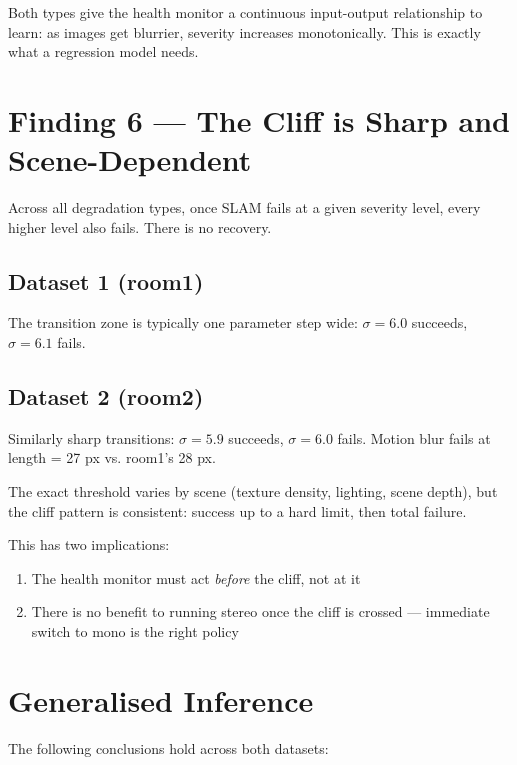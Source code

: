 \documentclass[11pt, a4paper]{article}
\begin{document}
Both types give the health monitor a continuous input-output relationship to
learn: as images get blurrier, severity increases monotonically. This is exactly
what a regression model needs.

\section{Finding 6 — The Cliff is Sharp and Scene-Dependent}

Across all degradation types, once SLAM fails at a given severity level, every
higher level also fails. There is no recovery.

\subsection{Dataset 1 (room1)}
The transition zone is typically one parameter step wide:
$\sigma = 6.0$ succeeds, $\sigma = 6.1$ fails.

\subsection{Dataset 2 (room2)}
Similarly sharp transitions: $\sigma = 5.9$ succeeds, $\sigma = 6.0$ fails.
Motion blur fails at length = 27 px vs. room1's 28 px.

The exact threshold varies by scene (texture density, lighting, scene depth),
but the cliff pattern is consistent: success up to a hard limit, then total failure.

This has two implications:
\begin{enumerate}
    \item The health monitor must act \textit{before} the cliff, not at it
    \item There is no benefit to running stereo once the cliff is crossed ---
          immediate switch to mono is the right policy
\end{enumerate}

\section{Generalised Inference}

The following conclusions hold across both datasets:
\end{document}
